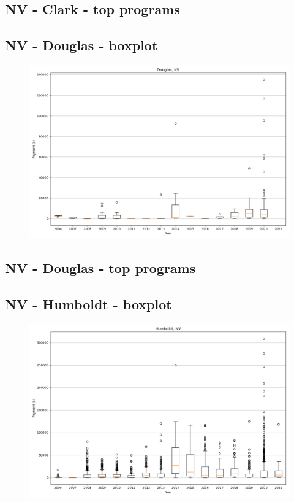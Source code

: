 \subsection*{NV - Clark - top programs}

\newpage
\subsection*{NV - Douglas - boxplot}
\begin{figure}[h]
\centering
\includegraphics[width=7in]{../output/boxplots/counties/Douglas-NV_boxplot.png}
\end{figure}


\subsection*{NV - Douglas - top programs}

\newpage
\subsection*{NV - Humboldt - boxplot}
\begin{figure}[h]
\centering
\includegraphics[width=7in]{../output/boxplots/counties/Humboldt-NV_boxplot.png}
\end{figure}



